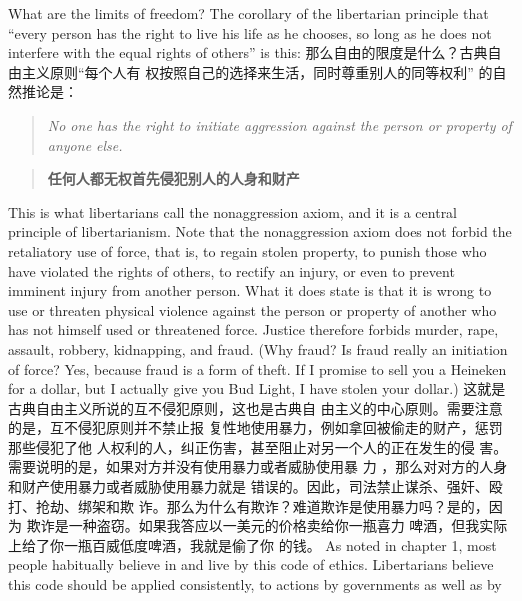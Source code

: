 \begin{paracol}{2}
What are the limits of freedom? The corollary of the libertarian
principle that ``every person has the right to live his life as he
chooses, so long as he does not interfere with the equal rights of
others'' is this:
\switchcolumn
那么自由的限度是什么？古典自由主义原则“每个人有
权按照自己的选择来生活，同时尊重别人的同等权利” 的自
然推论是：
\switchcolumn*
\begin{quote}
\textit{\textit{No one has the right to initiate aggression against the person or property of anyone else.}}
\end{quote}
\switchcolumn
\begin{quote}
	\textbf{\textbf{任何人都无权首先侵犯别人的人身和财产}}
\end{quote}
\switchcolumn*
This is what libertarians call the nonaggression axiom, and it is
a central principle of libertarianism. Note that the nonaggression axiom does not forbid the retaliatory use of force, that is, to regain stolen property, to punish those who have violated the
rights of others, to rectify an injury, or even to prevent imminent injury from another person. What it does state is that it is
wrong to use or threaten physical violence against the person or
property of another who has not himself used or threatened
force. Justice therefore forbids murder, rape, assault, robbery,
kidnapping, and fraud. (Why fraud? Is fraud really an initiation
of force? Yes, because fraud is a form of theft. If I promise to sell
you a Heineken for a dollar, but I actually give you Bud Light,
I have stolen your dollar.)
\switchcolumn
这就是古典自由主义所说的互不侵犯原则，这也是古典自
由主义的中心原则。需要注意的是，互不侵犯原则并不禁止报
复性地使用暴力，例如拿回被偷走的财产，惩罚那些侵犯了他
人权利的人，纠正伤害，甚至阻止对另一个人的正在发生的侵
害。需要说明的是，如果对方并没有使用暴力或者威胁使用暴
力 ，那么对对方的人身和财产使用暴力或者威胁使用暴力就是
错误的。因此，司法禁止谋杀、强奸、殴打、抢劫、绑架和欺
诈。那么为什么有欺诈？难道欺诈是使用暴力吗？是的，因为
欺诈是一种盗窃。如果我答应以一美元的价格卖给你一瓶喜力
啤酒，但我实际上给了你一瓶百威低度啤酒，我就是偷了你
的钱。
\switchcolumn*
As noted in chapter 1, most people habitually believe in and
live by this code of ethics. Libertarians believe this code should
be applied consistently, to actions by governments as well as by

\end{paracol}
